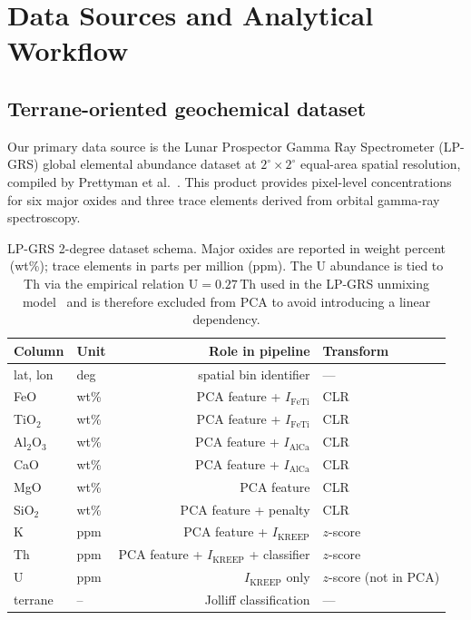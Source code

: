 \documentclass[11pt,a4paper]{article}
\begin{document}
\section{Data Sources and Analytical Workflow}

\subsection{Terrane-oriented geochemical dataset}

Our primary data source is the Lunar Prospector Gamma Ray Spectrometer (LP-GRS) global elemental abundance dataset at $2^\circ\times2^\circ$ equal-area spatial resolution, compiled by Prettyman et al.~\cite{Prettyman2006}. This product provides pixel-level concentrations for six major oxides and three trace elements derived from orbital gamma-ray spectroscopy.

\begin{table}[H]
\centering
\caption{LP-GRS 2-degree dataset schema. Major oxides are reported in weight percent (wt\%); trace elements in parts per million (ppm). The U abundance is tied to Th via the empirical relation $\text{U} = 0.27\,\text{Th}$ used in the LP-GRS unmixing model~\cite{Prettyman2006} and is therefore excluded from PCA to avoid introducing a linear dependency.}
\label{tab:schema}
\small
\begin{tabular}{llrl}
\toprule
\textbf{Column} & \textbf{Unit} & \textbf{Role in pipeline} & \textbf{Transform} \\
\midrule
lat, lon & deg & spatial bin identifier & --- \\
FeO      & wt\% & PCA feature + $I_\text{FeTi}$ & CLR \\
TiO$_2$  & wt\% & PCA feature + $I_\text{FeTi}$ & CLR \\
Al$_2$O$_3$ & wt\% & PCA feature + $I_\text{AlCa}$ & CLR \\
CaO      & wt\% & PCA feature + $I_\text{AlCa}$ & CLR \\
MgO      & wt\% & PCA feature & CLR \\
SiO$_2$  & wt\% & PCA feature + penalty & CLR \\
K        & ppm  & PCA feature + $I_\text{KREEP}$ & $z$-score \\
Th       & ppm  & PCA feature + $I_\text{KREEP}$ + classifier & $z$-score \\
U        & ppm  & $I_\text{KREEP}$ only & $z$-score (not in PCA) \\
terrane  & --   & Jolliff classification & --- \\
\bottomrule
\end{tabular}
\end{table}
\end{document}
